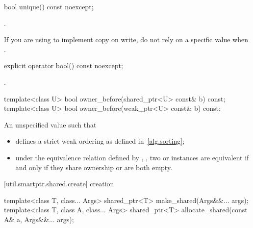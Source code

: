 %
%
\begin{itemdecl}
bool unique() const noexcept;
\end{itemdecl}

\begin{itemdescr}
\pnum\returns  {}.

\pnum \enternote If you are
using  to implement copy on write, do not rely on a
specific value when . \exitnote
\end{itemdescr}

%
%
\begin{itemdecl}
explicit operator bool() const noexcept;
\end{itemdecl}

\begin{itemdescr}
\pnum\returns {}.
\end{itemdescr}

%
%
\begin{itemdecl}
template<class U> bool owner_before(shared_ptr<U> const& b) const;
template<class U> bool owner_before(weak_ptr<U> const& b) const;
\end{itemdecl}

\begin{itemdescr}
\pnum
\returns An unspecified value such that

\begin{itemize}
\item {} defines a strict weak ordering as defined in~\ref{alg.sorting};

\item under the equivalence relation defined by ,
, two  or
 instances are equivalent if and only if they share ownership or
are both empty.
\end{itemize}

\end{itemdescr}


[util.smartptr.shared.create]{ creation}

%
%
\begin{itemdecl}
template<class T, class... Args> shared_ptr<T> make_shared(Args&&... args);
template<class T, class A, class... Args>
  shared_ptr<T> allocate_shared(const A& a, Args&&... args);
\end{itemdecl}

